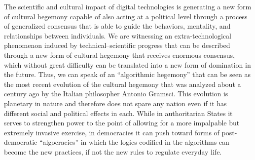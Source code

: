 The scientific and cultural impact of digital technologies is generating a new form of cultural hegemony capable of also acting at a political level through a process of generalized consensus that is able to guide the behaviors, mentality, and relationships between individuals. We are witnessing an extra-technological phenomenon induced by technical--scientific progress that can be described through a new form of cultural hegemony that receives enormous consensus, which without great difficulty can be translated into a new form of domination in the future. Thus, we can speak of an ``algorithmic hegemony'' that can be seen as the most recent evolution of the cultural hegemony that was analyzed about a century ago by the Italian philosopher Antonio Gramsci. This evolution is planetary in nature and therefore does not spare any nation even if it has different social and political effects in each. While in authoritarian States it serves to strengthen power to the point of allowing for a more impalpable but extremely invasive exercise, in democracies it can push toward forms of post-democratic ``algocracies'' in which the logics codified in the algorithms can become the new practices, if not the new rules to regulate everyday life.

